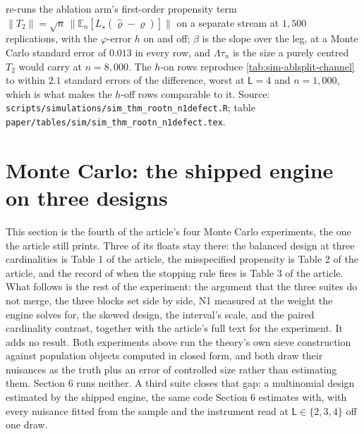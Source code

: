 \documentclass[
  12pt]{article}
\newcommand{\1}[1]{\mathds{1}\left[#1\right]}
\theoremstyle{plain}
\theoremstyle{definition}
\theoremstyle{definition}
\theoremstyle{remark}
\begin{document}
\begin{table}[!htbp]
\begin{threeparttable}
\begin{tablenotes}
re-runs the ablation arm's first-order propensity term
$\|T_2\|=\sqrt n\,\|\mathbb E_n[L_\star(\hat\varrho-\varrho)]\|$ on a separate
stream at $1{,}500$ replications, with the $\varphi$-error $h$ on and off;
$\beta$ is the slope over the leg, at a Monte Carlo standard error of $0.013$ in
every row, and $\Lambda\tau_n$ is the size a purely centred $T_2$ would carry at
$n=8{,}000$. The $h$-on rows reproduce \cref{tab:sim-ablsplit-channel} to within
$2.1$ standard errors of the difference, worst at $\mathsf L=4$ and $n=1{,}000$,
which is what makes the $h$-off rows comparable to it. Source:
\texttt{scripts/simulations/sim\_thm\_rootn\_n1defect.R}; table
\texttt{paper/tables/sim/sim\_thm\_rootn\_n1defect.tex}.
\end{tablenotes}
\end{threeparttable}
\end{table}

\clearpage

\section*{Monte Carlo: the shipped engine on three designs}

This section is the fourth of the article's four Monte Carlo experiments, the
one the article still prints. Three of its floats stay there: the balanced
design at three cardinalities is Table 1 of the article, the misspecified
propensity is Table 2 of the article, and the record of when the stopping rule
fires is Table 3 of the article. What follows is the rest of the experiment: the
argument that the three suites do not merge, the three blocks set side by side,
N1 measured at the weight the engine solves for, the skewed design, the
interval's scale, and the paired cardinality contrast, together with the
article's full text for the experiment. It adds no result.
Both experiments above run the theory's own sieve construction against population
objects computed in closed form, and both draw their nuisances as the truth plus
an error of controlled size rather than estimating them. Section 6 runs neither.
A third suite closes that gap: a multinomial design estimated by the shipped
engine, the same code Section 6 estimates with, with every nuisance fitted from
the sample and the instrument read at $\mathsf L\in\{2,3,4\}$ off one draw.
\end{document}
